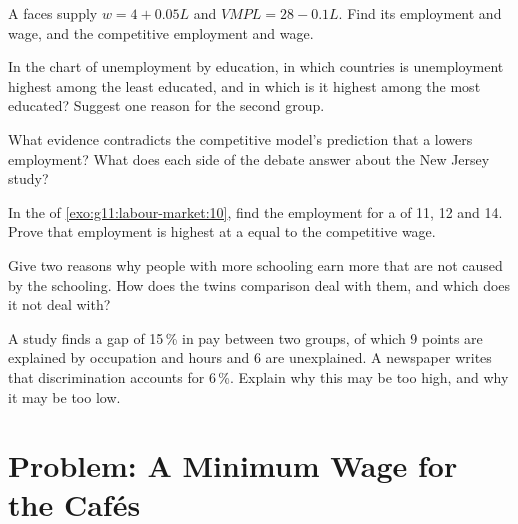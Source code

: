 \begin{exercise}[$\star\star$]\label{exo:g11:labour-market:10}
A  faces supply $w = 4 + 0.05L$ and $\mathit{VMPL} = 28 - 0.1L$. Find its employment and wage, and the competitive employment and wage.
\end{exercise}

\begin{exercise}[$\star\star$]\label{exo:g11:labour-market:11}
In the chart of unemployment by education, in which countries is unemployment highest among the least educated, and in which is it highest among the most educated?
Suggest one reason for the second group.
\end{exercise}

\begin{exercise}[$\star\star\star$]\label{exo:g11:labour-market:12}
What evidence contradicts the competitive model's prediction that a  lowers employment? What does each side of the debate answer about the New Jersey
study?
\end{exercise}

\begin{exercise}[$\star\star\star$]\label{exo:g11:labour-market:13}
In the  of \cref{exo:g11:labour-market:10}, find the employment for a  of 11, 12 and 14. Prove that employment is highest at a  equal
to the competitive wage.
\end{exercise}

\begin{exercise}[$\star\star\star$]\label{exo:g11:labour-market:14}
Give two reasons why people with more schooling earn more that are not caused by the schooling. How does the twins comparison deal with them, and which does it not deal
with?
\end{exercise}

\begin{exercise}[$\star\star\star$]\label{exo:g11:labour-market:15}
A study finds a gap of 15\,\% in pay between two groups, of which 9 points are explained by occupation and hours and 6 are unexplained. A newspaper writes that
discrimination accounts for 6\,\%. Explain why this may be too high, and why it may be too low.
\end{exercise}

\section{Problem: A Minimum Wage for the Cafés}

